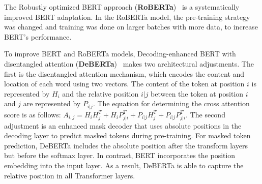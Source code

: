 \documentclass[runningheads]{llncs}
\begin{document}
The Robustly optimized BERT approach (\textbf{RoBERTa})~\cite{liu2019roberta} is a systematically improved \ac{BERT} adaptation.
In the \ac{RoBERTa} model, the pre-training strategy was changed and training was done on larger batches with more data, to increase \ac{BERT}'s performance. 


To improve BERT and RoBERTa models, Decoding-enhanced BERT with disentangled attention (\textbf{DeBERTa})~\cite{DBLP:conf/iclr/HeLGC21} makes two architectural adjustments.
The first is the disentangled attention mechanism, which encodes the content and location of each word using two vectors. The content of the token at position $i$ is represented by  $H_i$ and the relative position $i | j$ between the token at position $i$ and $j$ are represented by $P_{i|j}$. The equation for determining the cross attention score is as follows:
 $    A_{i,j} = H_iH_j^T + H_iP_{j|i}^T + P_{i|j}H_j^T + P_{i|j}P_{j|i}^T$.
The second adjustment is an enhanced mask decoder that uses absolute positions in the decoding layer to predict masked tokens during pre-training. 
For masked token prediction, DeBERTa includes the absolute position after the transform layers but before the softmax layer.
In contrast, BERT incorporates the position embedding into the input layer.
As a result, DeBERTa is able to capture the relative position in all Transformer layers.
\end{document}
